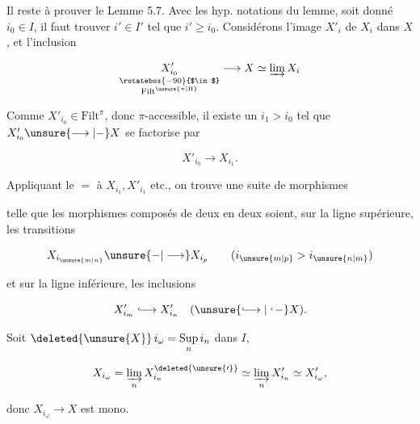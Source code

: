 
Il reste à prouver le Lemme 5.7.  Avec les hyp.  notations du lemme, soit donné $i_0\in I$, il faut trouver $i'\in I'$ tel que $i'\geq i_0$. Considérons l'image $X'_i$ de $X_i$ dans $X$, et l'inclusion

\[
\underset{\substack{\rotatebox{-90}{$\in$}\\\mathrm{Filt}^{\unsure{\pi|\Pi}}}}{X'_{i_0}}\longrightarrow X\simeq\varinjlim X_i
\]

Comme $X'_{i_0}\in\mathrm{Filt}^\pi$, donc  $\pi$-accessible, il existe un $i_1>i_0$ tel que $X'_{i_0}\unsure{\longrightarrow|-} X$ se factorise par

\[
X'_{i_0}\longrightarrow X_{i_1}.
\]

Appliquant le $=$  à $X_{i_1},X'_{i_1}$ etc., on trouve une suite  de morphismes


telle que les morphismes composés de deux en deux soient,  sur la ligne supérieure, les transitions

\[
X_{i_{\unsure{m|n}}}\unsure{-|\longrightarrow} X_{i_p}\qquad(i_{\unsure{m|p}}>i_{\unsure{n|m}})
\]

et sur la ligne inférieure, les inclusions

\[
 X'_{i_m}\lhook\joinrel\longrightarrow X'_{i_n}\quad(\unsure{\lhook\joinrel\longrightarrow|\lhook\joinrel-} X).
\]

Soit $\deleted{\unsure{X}}\,i_\omega=\underset{n}{\mathrm{Sup}}\,i_n$ dans $I$, 

\[
 X_{i_\omega}=\varinjlim_n X^{\deleted{\unsure{\prime}}}_{i_n}\simeq\varinjlim_n X'_{i_n}\simeq X'_{i_\omega},
\]

donc $X_{i_\omega}\longrightarrow X$ est mono.

